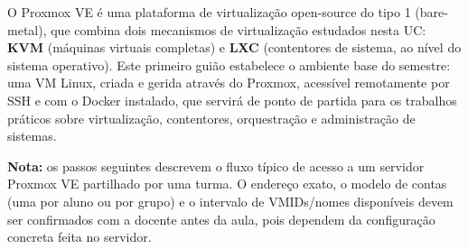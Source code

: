 \documentclass[11pt,a4paper]{article}
\begin{document}
O Proxmox VE é uma plataforma de virtualização open-source do tipo 1 (bare-metal), que combina dois mecanismos de virtualização estudados nesta UC: \textbf{KVM} (máquinas virtuais completas) e \textbf{LXC} (contentores de sistema, ao nível do sistema operativo). Este primeiro guião estabelece o ambiente base do semestre: uma VM Linux, criada e gerida através do Proxmox, acessível remotamente por SSH e com o Docker instalado, que servirá de ponto de partida para os trabalhos práticos sobre virtualização, contentores, orquestração e administração de sistemas.

\textbf{Nota:} os passos seguintes descrevem o fluxo típico de acesso a um servidor Proxmox VE partilhado por uma turma. O endereço exato, o modelo de contas (uma por aluno ou por grupo) e o intervalo de VMIDs/nomes disponíveis devem ser confirmados com a docente antes da aula, pois dependem da configuração concreta feita no servidor.
\end{document}
